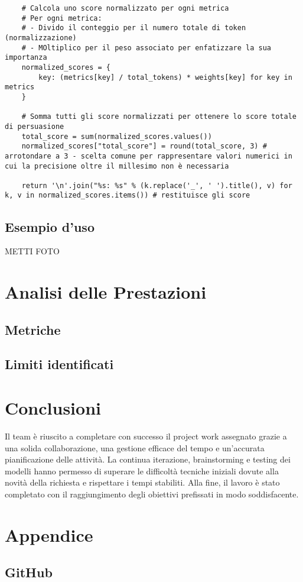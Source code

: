 \documentclass[12pt]{article}
\begin{document}
\begin{lstlisting}
	# Calcola uno score normalizzato per ogni metrica
	# Per ogni metrica:
	# - Divido il conteggio per il numero totale di token (normalizzazione)
	# - MOltiplico per il peso associato per enfatizzare la sua importanza 
	normalized_scores = {
		key: (metrics[key] / total_tokens) * weights[key] for key in metrics
	}

	# Somma tutti gli score normalizzati per ottenere lo score totale di persuasione
	total_score = sum(normalized_scores.values())
	normalized_scores["total_score"] = round(total_score, 3) # arrotondare a 3 - scelta comune per rappresentare valori numerici in cui la precisione oltre il millesimo non è necessaria
	
	return '\n'.join("%s: %s" % (k.replace('_', ' ').title(), v) for k, v in normalized_scores.items()) # restituisce gli score
	\end{lstlisting}
	
	\subsection{Esempio d'uso}

\newpage
	\textsc{\large METTI FOTO}\\[0.2cm]
\section{Analisi delle Prestazioni}
	\subsection{Metriche}
	\subsection{Limiti identificati}

\newpage
\section{Conclusioni}
Il team è riuscito a completare con successo il project work assegnato grazie a una solida collaborazione, una gestione efficace del tempo e un'accurata pianificazione delle attività.  La continua iterazione, brainstorming e testing dei modelli hanno permesso di superare le difficoltà tecniche iniziali dovute alla novità della richiesta e rispettare i tempi stabiliti. Alla fine, il lavoro è stato completato con il raggiungimento degli obiettivi prefissati in modo soddisfacente.

\section{Appendice}
\subsection{GitHub}
\end{document}
